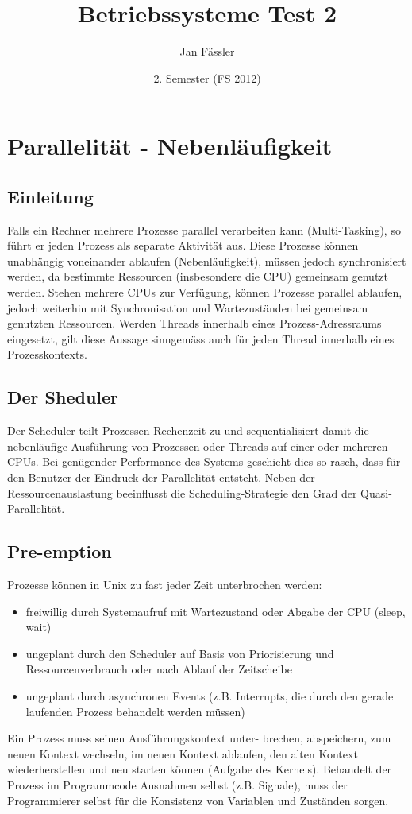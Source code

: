 \documentclass[a4paper, 10pt]{article}
\title{Betriebssysteme Test 2}
\author{Jan F\"assler}
\date{2. Semester (FS 2012)}
\begin{document}
\maketitle
\newpage
\section{Parallelität - Nebenläufigkeit}
\subsection{Einleitung}
Falls ein Rechner mehrere Prozesse parallel verarbeiten kann (Multi-Tasking), so führt er jeden Prozess als separate Aktivität aus. Diese Prozesse können unabhängig voneinander ablaufen (Nebenläufigkeit), müssen jedoch synchronisiert werden, da bestimmte Ressourcen (insbesondere die CPU) gemeinsam genutzt werden. Stehen mehrere CPUs zur Verfügung, können Prozesse parallel ablaufen, jedoch weiterhin mit Synchronisation und Wartezuständen bei gemeinsam genutzten Ressourcen. Werden Threads innerhalb eines Prozess-Adressraums eingesetzt, gilt diese Aussage sinngemäss auch für jeden Thread innerhalb eines Prozesskontexts.

\subsection{Der Sheduler}
Der Scheduler teilt Prozessen Rechenzeit zu und sequentialisiert damit die nebenläufige Ausführung von Prozessen oder Threads auf einer oder mehreren CPUs. Bei genügender Performance des Systems geschieht dies so rasch, dass für den Benutzer der Eindruck der Parallelität entsteht. Neben der Ressourcenauslastung beeinflusst die Scheduling-Strategie den Grad der Quasi-Parallelität.

\subsection{Pre-emption}
Prozesse können in Unix zu fast jeder Zeit unterbrochen werden:
\begin{itemize}
	\item freiwillig durch Systemaufruf mit Wartezustand oder Abgabe der CPU (sleep, wait)
	\item ungeplant durch den Scheduler auf Basis von Priorisierung und Ressourcenverbrauch oder nach Ablauf der Zeitscheibe
	\item ungeplant durch asynchronen Events (z.B. Interrupts, die durch den gerade laufenden Prozess behandelt werden müssen)
\end{itemize}
Ein Prozess muss seinen Ausführungskontext unter- brechen, abspeichern, zum neuen Kontext wechseln, im neuen Kontext ablaufen, den alten Kontext wiederherstellen und neu starten können (Aufgabe des Kernels). Behandelt der Prozess im Programmcode Ausnahmen selbst (z.B. Signale), muss der Programmierer selbst für die Konsistenz von Variablen und Zuständen sorgen.
\end{document}
